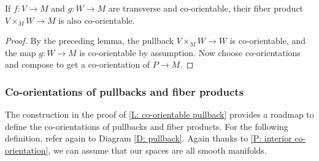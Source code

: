 \begin{corollary}
	If $f \colon V \to M$ and $g \colon W \to M$ are transverse and co-orientable, their fiber product $V \times_M W \to M$ is also co-orientable.
\end{corollary}

\begin{proof}
	By the preceding lemma, the pullback $V \times_M W \to W$ is co-orientable, and the map $g \colon W \to M$ is co-orientable by assumption.
	Now choose co-orientations and compose to get a co-orientation of $P \to M$.
\end{proof}

\subsubsection{Co-orientations of pullbacks and fiber products}\label{S: co-orientation of pullbacks}

The construction in the proof of \cref{L: co-orientable pullback} provides a roadmap to define the co-orientations of pullbacks and fiber products.
For the following definition, refer again to Diagram \eqref{D: pullback}. Again thanks to \cref{P: interior co-orientation}, we can assume that our spaces are all smooth manifolds.

